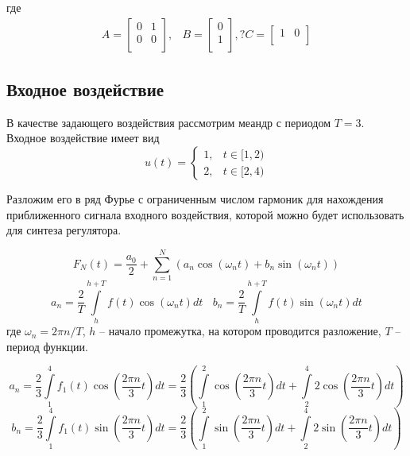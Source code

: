 где     
\begin{equation}
    \begin{array}{ccc}
        A = \begin{bmatrix}
            0 & 1 \\ 
            0 & 0 \\
        \end{bmatrix}, & 
        B = \begin{bmatrix}
            0 \\ 
            1 \\
        \end{bmatrix}, ? 
        C = \begin{bmatrix}
            1 & 0 \\
        \end{bmatrix}
    \end{array}
\end{equation}

\subsection{Входное воздействие}
В качестве задающего воздействия рассмотрим меандр с периодом $T = 3$. 
Входное воздействие имеет вид
\begin{equation}
    u(t) = 
    \begin{cases}
        1, & t \in [1, 2) \\
        2, & t \in [2, 4)
    \end{cases}
    \label{eq:func_1}
\end{equation}

Разложим его в ряд Фурье с ограниченным числом гармоник для нахождения 
приближенного сигнала входного воздействия, которой можно будет использовать для 
синтеза регулятора.

\begin{equation}
    F_N(t) = \frac{a_0}{2} + \sum\limits_{n=1}^{N} \left( a_n \cos(\omega_n t) + b_n \sin(\omega_n t) \right)
    \label{eq:fourier}
\end{equation}
\begin{equation}
    a_n = \frac{2}{T} \int\limits_{h}^{h + T} f(t) \cos(\omega_n t) dt ~~~~ b_n = \frac{2}{T} \int\limits_{h}^{h + T} f(t) \sin(\omega_n t) dt 
    \label{eq:fourier_coefficients}
\end{equation}
где $\omega_n = 2\pi n / T$, $h$ -- начало промежутка, на котором проводится разложение, $T$ -- период функции.

\begin{equation}
    a_n = \frac{2}{3} \int\limits_{1}^{4} f_1(t) \cos\left( \frac{2\pi n}{3} t\right) dt = \frac{2}{3} \left( \int\limits_{1}^{2} \cos\left( \frac{2\pi n}{3} t\right) dt + \int\limits_{2}^{4} 2 \cos\left( \frac{2\pi n}{3} t\right) dt \right) 
\end{equation}
\begin{equation}
    b_n = \frac{2}{3} \int\limits_{1}^{4} f_1(t) \sin\left( \frac{2\pi n}{3} t\right) dt = \frac{2}{3} \left( \int\limits_{1}^{2} \sin\left( \frac{2\pi n}{3} t\right) dt + \int\limits_{2}^{4} 2 \sin\left( \frac{2\pi n}{3} t\right) dt \right) 
\end{equation}

